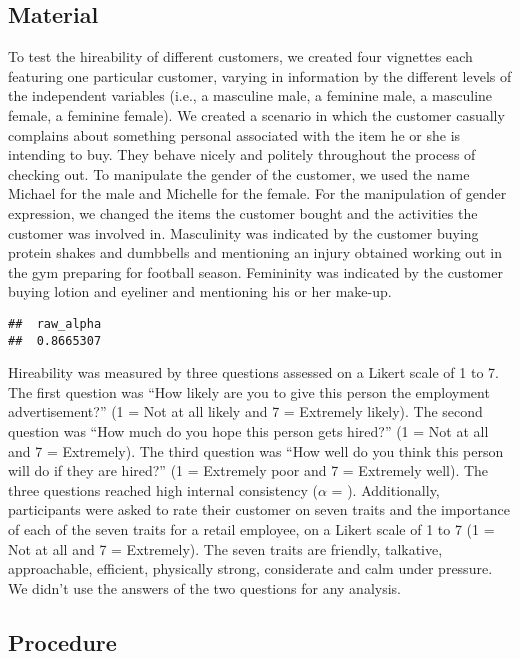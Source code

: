 \documentclass[english,man]{apa6}
\theoremstyle{definition}
\theoremstyle{definition}
\theoremstyle{remark}
\begin{document}
\subsection{Material}\label{material}

To test the hireability of different customers, we created four
vignettes each featuring one particular customer, varying in information
by the different levels of the independent variables (i.e., a masculine
male, a feminine male, a masculine female, a feminine female). We
created a scenario in which the customer casually complains about
something personal associated with the item he or she is intending to
buy. They behave nicely and politely throughout the process of checking
out. To manipulate the gender of the customer, we used the name Michael
for the male and Michelle for the female. For the manipulation of gender
expression, we changed the items the customer bought and the activities
the customer was involved in. Masculinity was indicated by the customer
buying protein shakes and dumbbells and mentioning an injury obtained
working out in the gym preparing for football season. Femininity was
indicated by the customer buying lotion and eyeliner and mentioning his
or her make-up.

\begin{verbatim}
##  raw_alpha
##  0.8665307
\end{verbatim}

Hireability was measured by three questions assessed on a Likert scale
of 1 to 7. The first question was \enquote{How likely are you to give
this person the employment advertisement?} (1 = Not at all likely and 7
= Extremely likely). The second question was \enquote{How much do you
hope this person gets hired?} (1 = Not at all and 7 = Extremely). The
third question was \enquote{How well do you think this person will do if
they are hired?} (1 = Extremely poor and 7 = Extremely well). The three
questions reached high internal consistency (\(\alpha\) = ).
Additionally, participants were asked to rate their customer on seven
traits and the importance of each of the seven traits for a retail
employee, on a Likert scale of 1 to 7 (1 = Not at all and 7 =
Extremely). The seven traits are friendly, talkative, approachable,
efficient, physically strong, considerate and calm under pressure. We
didn't use the answers of the two questions for any analysis.

\subsection{Procedure}\label{procedure}
\end{document}
